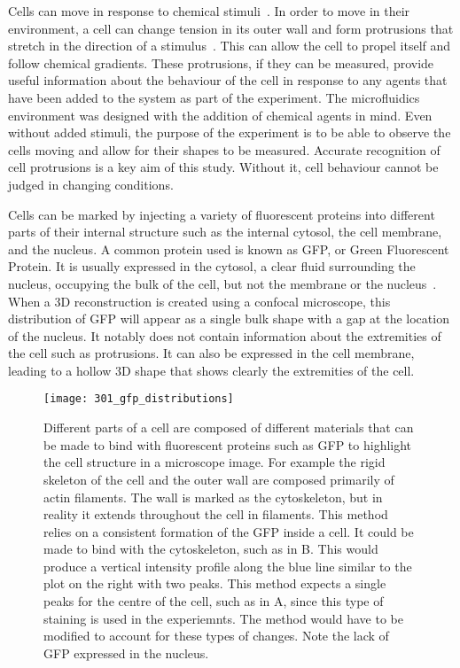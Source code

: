 Cells can move in response to chemical stimuli~\cite{Stetler:93}. In order to move in their environment, a cell can change tension in its outer wall and form protrusions that stretch in the direction of a stimulus~\cite{Stetler:93}. This can allow the cell to propel itself and follow chemical gradients. These protrusions, if they can be measured, provide useful information about the behaviour of the cell in response to any agents that have been added to the system as part of the experiment. The microfluidics environment was designed with the addition of chemical agents in mind. Even without added stimuli, the purpose of the experiment is to be able to observe the cells moving and allow for their shapes to be measured. Accurate recognition of cell protrusions is a key aim of this study. Without it, cell behaviour cannot be judged in changing conditions.

Cells can be marked by injecting a variety of fluorescent proteins into different parts of their internal structure such as the internal cytosol, the cell membrane, and the nucleus. A common protein used is known as GFP, or Green Fluorescent Protein. It is usually expressed in the cytosol, a clear fluid surrounding the nucleus, occupying the bulk of the cell, but not the membrane or the nucleus~\cite{}. When a 3D reconstruction is created using a confocal microscope, this distribution of GFP will appear as a single bulk shape with a gap at the location of the nucleus. It notably does not contain information about the extremities of the cell such as protrusions. It can also be expressed in the cell membrane, leading to a hollow 3D shape that shows clearly the extremities of the cell.

\begin{figure}[h!]
 \centering
 \texttt{[image: 301\_gfp\_distributions]}
 \caption[Possible GFP distributions]{
	Different parts of a cell are composed of different materials that can be made to bind with fluorescent proteins such as GFP to highlight the cell structure in a microscope image. For example the rigid skeleton of the cell and the outer wall are composed primarily of actin filaments. The wall is marked as the cytoskeleton, but in reality it extends throughout the cell in filaments. This method relies on a consistent formation of the GFP inside a cell. It could be made to bind with the cytoskeleton, such as in B. This would produce a vertical intensity profile along the blue line similar to the plot on the right with two peaks. This method expects a single peaks for the centre of the cell, such as in A, since this type of staining is used in the experiemnts. The method would have to be modified to account for these types of changes. Note the lack of GFP expressed in the nucleus.
 }
 \label{fig:gfpdistributions}
\end{figure}

